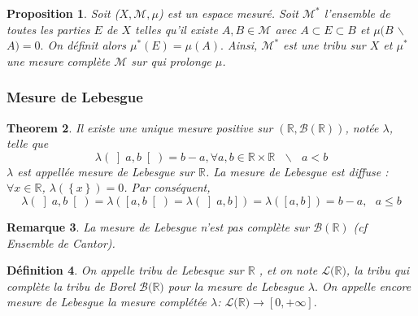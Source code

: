 \documentclass[3pt]{article}
\newtheorem{theorem}{Theorem}
\newtheorem{definition}[theorem]{D\'{e}finition}
\newtheorem{proposition}[theorem]{Proposition}
\newtheorem{remark}[theorem]{Remarque}
\begin{document}
\begin{proposition}
Soit ($X,\mathcal{M},\mu $) est un espace mesur\'{e}. Soit $\mathcal{M}%
^{\ast }$ l'ensemble de toutes les parties $E$ de $X$ telles qu'il existe $%
A,B\in \mathcal{M}$ avec $A\subset E\subset B$ et $\mu (B$ $\backslash $ $%
A)=0.$ On d\'{e}finit alors $\mu ^{\ast }(E)=\mu (A).$ Ainsi, $\mathcal{M}%
^{\ast }$ est une tribu sur $X$ et $\mu ^{\ast }$ une mesure compl\`{e}te $%
\mathcal{M}$ sur qui prolonge $\mu $.
\end{proposition}

\subsubsection{Mesure de Lebesgue}

\bigskip

\begin{theorem}
Il existe une unique mesure positive sur $(\mathbb{R},\mathcal{B(\mathbb{R})}%
)$, not\'{e}e $\lambda $, telle que 
\begin{equation*}
\lambda (\left] a,b\right[ )=b-a,\forall a,b\in \mathbb{R}\times \mathbb{R}%
\text{ }\backslash \text{ }a<b
\end{equation*}%
$\lambda $ est appell\'{e}e mesure de Lebesgue sur $\mathbb{R}$. La mesure
de Lebesgue est diffuse : $\forall x\in \mathbb{R}$, $\lambda (\left\{
x\right\} )=0$. Par cons\'{e}quent,%
\begin{equation*}
\lambda (\left] a,b\right[ )=\lambda (\left[ a,b\right[ )=\lambda (\left] a,b%
\right] )=\lambda (\left[ a,b\right] )=b-a,\text{ }a\leq b
\end{equation*}
\end{theorem}

\bigskip

\begin{remark}
La mesure de Lebesgue n'est pas compl\`{e}te sur $\mathcal{B(\mathbb{R})}$
(cf Ensemble de Cantor).
\end{remark}

\bigskip

\begin{definition}
On appelle tribu de Lebesque sur $\mathbb{R}$ , et on note $\mathcal{L(}%
\mathbb{R}\mathcal{)}$, la tribu qui compl\`{e}te la tribu de Borel $%
\mathcal{B(}\mathbb{R}\mathcal{)}$ pour la mesure de Lebesgue $\lambda .$ On
appelle encore mesure de Lebesgue la mesure compl\'{e}t\'{e}e $\lambda $: $%
\mathcal{L(}\mathbb{R}\mathcal{)\rightarrow }\left[ 0,+\infty \right] .$
\end{definition}
\end{document}

